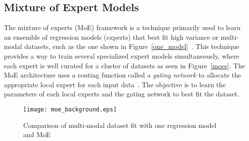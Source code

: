 \subsection{Mixture of Expert Models}
\label{ssec:mixture_of_experts}


The mixture of experts (MoE) framework is a technique primarily used to learn an
ensemble of regression models (experts) that best fit high variance or
multi-modal datasets, such as the one shown in
Figure~\ref{one_model}~\cite{bishop2006pattern}.
%
This technique provides a way to train several specialized expert models
simultaneously, where each expert is well curated for a cluster of datasets as
seen in Figure~\ref{moes}.
%
The MoE architecture uses a routing function called a \textit{gating network} to
allocate the appropriate local expert for each input
data~\cite{harkonen2022mixtures}.
%
The objective is to learn the parameters of each local experts and the gating
network to best fit the dataset.
%
\begin{figure}[tb]
  \centering
  \texttt{[image: moe\_background.eps]}
   \caption{Comparison of multi-modal dataset
  fit with one regression model and MoE }{\hspace{0.5\linewidth}}
  \label{fig:oldfaithful}
\end{figure}

